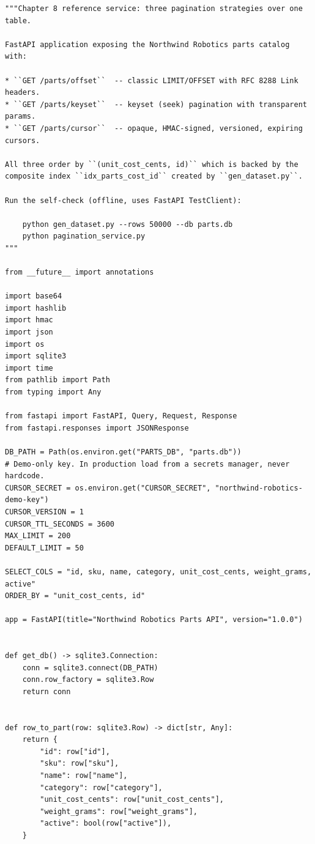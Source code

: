 \begin{verbatim}
"""Chapter 8 reference service: three pagination strategies over one table.

FastAPI application exposing the Northwind Robotics parts catalog with:

* ``GET /parts/offset``  -- classic LIMIT/OFFSET with RFC 8288 Link headers.
* ``GET /parts/keyset``  -- keyset (seek) pagination with transparent params.
* ``GET /parts/cursor``  -- opaque, HMAC-signed, versioned, expiring cursors.

All three order by ``(unit_cost_cents, id)`` which is backed by the
composite index ``idx_parts_cost_id`` created by ``gen_dataset.py``.

Run the self-check (offline, uses FastAPI TestClient):

    python gen_dataset.py --rows 50000 --db parts.db
    python pagination_service.py
"""

from __future__ import annotations

import base64
import hashlib
import hmac
import json
import os
import sqlite3
import time
from pathlib import Path
from typing import Any

from fastapi import FastAPI, Query, Request, Response
from fastapi.responses import JSONResponse

DB_PATH = Path(os.environ.get("PARTS_DB", "parts.db"))
# Demo-only key. In production load from a secrets manager, never hardcode.
CURSOR_SECRET = os.environ.get("CURSOR_SECRET", "northwind-robotics-demo-key")
CURSOR_VERSION = 1
CURSOR_TTL_SECONDS = 3600
MAX_LIMIT = 200
DEFAULT_LIMIT = 50

SELECT_COLS = "id, sku, name, category, unit_cost_cents, weight_grams, active"
ORDER_BY = "unit_cost_cents, id"

app = FastAPI(title="Northwind Robotics Parts API", version="1.0.0")


def get_db() -> sqlite3.Connection:
    conn = sqlite3.connect(DB_PATH)
    conn.row_factory = sqlite3.Row
    return conn


def row_to_part(row: sqlite3.Row) -> dict[str, Any]:
    return {
        "id": row["id"],
        "sku": row["sku"],
        "name": row["name"],
        "category": row["category"],
        "unit_cost_cents": row["unit_cost_cents"],
        "weight_grams": row["weight_grams"],
        "active": bool(row["active"]),
    }



\end{verbatim}
